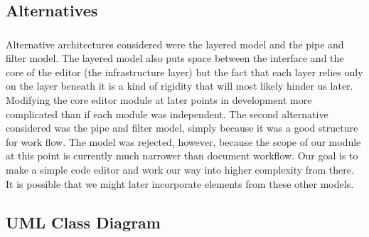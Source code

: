 \documentclass{llncs}
\begin{document}
\subsection{Alternatives}
\subsubsection{}
Alternative architectures considered were the layered model and the pipe and filter model. The layered model also puts space between the interface and the core of the editor (the infrastructure layer) but the fact that each layer relies only on the layer beneath it is a kind of rigidity that will most likely hinder us later. Modifying the core editor module at later points in development more complicated than if each module was independent. The second alternative considered was the pipe and filter model, simply because it was a good structure for work flow. The model was rejected, however, because the scope of our module at this point is currently much narrower than document workflow. Our goal is to make a simple code editor and work our way into higher complexity from there. It is possible that we might later incorporate elements from these other models.

\subsection{UML Class Diagram}
\subsubsection{}
\noindent{}
\end{document}

